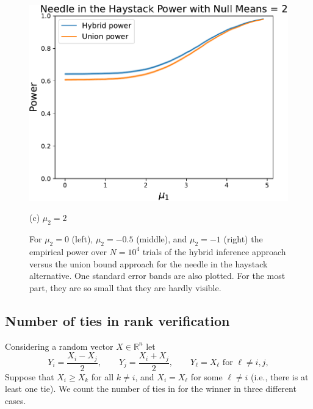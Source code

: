 \documentclass{article}
\newcommand{\R}{\mathbb{R}}
\begin{document}
\begin{appendix}
\begin{figure}
    \hfill
    \hspace{0.01\textwidth}
    \begin{minipage}{0.32\textwidth}
        \centering
        \includegraphics[width=\textwidth]{fig/hybrid_vs_union_null=2.pdf}
        \caption*{(c) $\mu_2=2$}
    \end{minipage}
    \caption{ For $\mu_2=0$ (left), $\mu_2=-0.5$ (middle), and $\mu_2=-1$ (right) the empirical power over $N=10^4$ trials of the hybrid inference approach versus the union bound approach for the needle in the haystack alternative. One standard error bands are also plotted. For the most part, they are so small that they are hardly visible.  }
    \label{fig:hybrid_union_power}
\end{figure}

\subsection{Number of ties in rank verification}
\label{sec:ties_appdx}

Considering a random vector $X \in \R^n$ let 
\begin{equation}
    Y_i = \frac{X_i - X_j}{2}, \qquad  Y_j = \frac{X_i + X_j}{2}, \qquad  Y_{\ell} = X_{\ell} \text{ for } \ell \neq i, j,
\end{equation}
Suppose that $X_i \geq X_k$ for all $k \neq i$, and $X_i = X_{\ell}$ for some $\ell \neq i$ (i.e., there is at least one tie). We count the number of ties in for the winner in three different cases.


\end{appendix}
\end{document}
